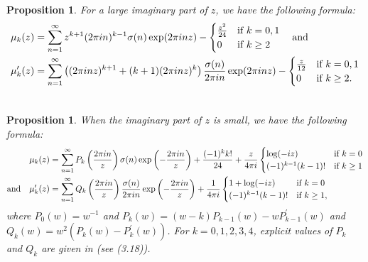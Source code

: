 \documentclass[11pt]{amsart}
\theoremstyle{plain}
\newtheorem{proposition}[theorem]{Proposition}
\numberwithin{equation}{section}
\begin{document}
	\begin{proposition}\label{eq-(2.1)}
		For a large imaginary part of $z$, we have the following formula:
		\begin{align*}
			\notag
			\mu_{k}(z)&=\sum_{n=1}^{\infty}z^{k+1}(2\pi in)^{k-1}\sigma(n)\exp(2\pi inz)- \begin{cases} 
				\frac{z^{2}}{24} & \mbox{if } k=0,1 \\ 
				0 & \mbox{if } k\ge 2 
			\end{cases} \quad\text{and}\\  
			\mu_{k}^{\prime}(z)&=\sum_{n=1}^{\infty}\left((2\pi inz)^{k+1}+(k+1)(2\pi inz)^{k}\right) \frac{\sigma(n)}{2\pi in}\exp(2\pi inz)-\begin{cases} 
				\frac{z}{12} & \mbox{if } k=0,1 \\ 
				0 & \mbox{if } k\ge 2. 
			\end{cases}\\ 
			\notag   
		\end{align*}
	\end{proposition}
	\begin{proposition}\label{eq-(2.12)}
		When the imaginary part of $z$ is small, we have the following formula:
		\begin{align*}
			\mu_{k}(z)&=\sum_{n=1}^{\infty}P_{k}\left(\frac{2\pi in}{z}\right)\sigma(n)\exp\left(-\frac{2\pi in}{z}\right)+\frac{(-1)^{k}k!}{24}+\frac{z}{4\pi i}\begin{cases} 
				\log(-iz) & \text{if } k=0 \\ 
				(-1)^{k-1}(k-1)! & \mbox{if } k\ge 1 
			\end{cases}\\
			\notag
			\text{and}\quad \mu_{k}^{\prime}(z)&=\sum_{n=1}^{\infty}Q_{k}\left(\frac{2\pi in}{z}\right)\frac{\sigma(n)}{2\pi in}\exp\left(-\frac{2\pi in}{z}\right)+\frac{1}{4\pi i}\begin{cases} 
				1+\log (-iz) & \mbox{if } k=0 \\ 
				(-1)^{k-1}(k-1)! & \mbox{if } k\ge 1, 
			\end{cases}          
		\end{align*}  
		where $P_0(w)=w^{-1}$ and $P_{k}(w)=(w-k)P_{k-1}(w)-wP^{\prime}_{k-1}(w)$ and $Q_k(w)=w^{2}(P_k(w)-P^{\prime}_k(w))$. For $k=0,1,2,3,4$, explicit values of $P_k$ and $Q_k$ are given in \cite{tyler2024asymptotics} (see (3.18)). 
	\end{proposition}
\end{document}
